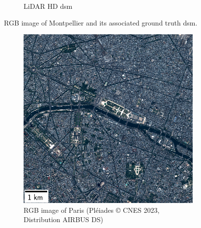 \begin{figure}
\begin{subfigure}[t]{0.48\linewidth}
        \caption{LiDAR HD \acrshort{dsm}}
        \label{fig:miniature_Montpellier_gt}
    \end{subfigure}
    \caption{RGB image of Montpellier and its associated ground truth \acrshort{dsm}.}
    \label{fig:miniature_Montpellier}
\end{figure}

\begin{figure}
    \centering
    \begin{subfigure}[t]{0.48\linewidth}
        \flushleft
        \includegraphics[width=\linewidth]{Images/Chap_6/miniature_Paris.png}
        \caption{RGB image of Paris (Pléiades © CNES 2023, Distribution AIRBUS DS)}
        \label{fig:miniature_Paris_rgb}
    \end{subfigure}\hfill
    \begin{subfigure}[t]{0.48\linewidth}
        \flushright

\end{subfigure}
\end{figure}
